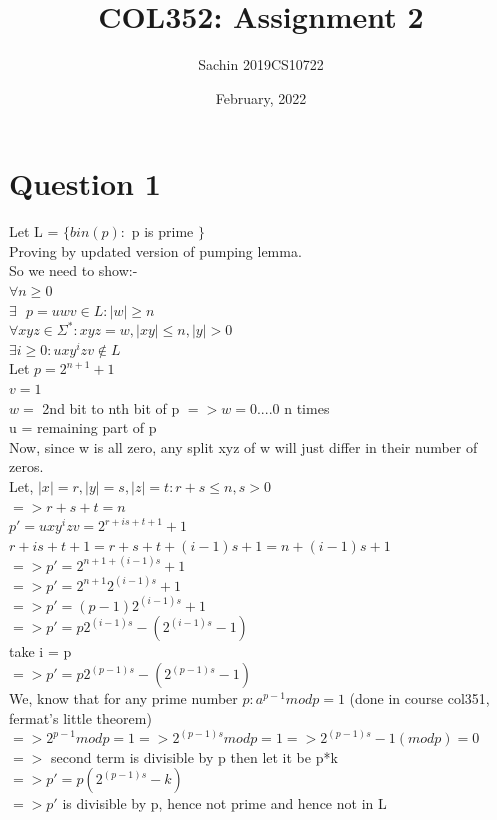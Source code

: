\documentclass{article}
\title{COL352: Assignment 2}
\author{Sachin 2019CS10722 }
\date{February, 2022}
\begin{document}
\maketitle


\section{Question 1}
Let L = $\{ bin(p) : $ p is prime $\}$\\

Proving by updated version of pumping lemma.\\
So we need to show:-\\
$\forall n \geq 0$\\
$\exists \text{ } p = uwv \in L : |w| \geq n$\\
$\forall xyz \in \Sigma^* : xyz = w, |xy| \leq n, |y| > 0$\\
$\exists i \geq 0 : uxy^izv \notin L$\\

Let $p = 2^{n+1} + 1$\\
$v = 1$\\
$w = $ 2nd bit to nth bit of p $=> w = 0....0 $ n times\\
u = remaining part of p\\

Now, since w is all zero, any split xyz of w will just differ in their number of zeros. \\
Let, $|x| = r, |y| = s, |z| = t : r+s \leq n, s > 0$\\
$=> r+s+t = n$\\
$p' = uxy^izv = 2^{r+is+t+1} + 1$\\
$r+is+t+1 = r+s+t + (i-1)s + 1 = n + (i-1)s + 1$\\
$=> p' = 2^{n+1+(i-1)s} + 1$\\
$=> p' = 2^{n+1}2^{(i-1)s} + 1$\\
$=> p' = (p-1)2^{(i-1)s} + 1$  \\
$=> p' = p2^{(i-1)s} - (2^{(i-1)s} - 1)$\\
take i = p\\
$=> p' = p2^{(p-1)s} - (2^{(p-1)s} - 1)$\\
We, know that for any prime number $p : a^{p-1} mod p = 1$ (done in course col351, fermat's little theorem)\\
$=> 2^{p-1} mod p = 1 => 2^{(p-1)s} mod p = 1 => 2^{(p-1)s} - 1 (mod p) = 0$\\
$=> $ second term is divisible by p then let it be p*k\\
$=> p' = p (2^{(p-1)s} - k)$\\
$=> p' $ is divisible by p, hence not prime and hence not in L\\
\end{document}
